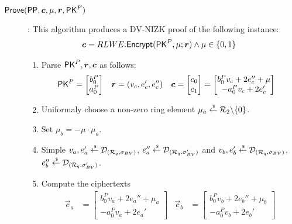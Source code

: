 \begin{description}
\item[$\Prove(\PPP, \vec{c}, \mu, \vec{r}, \PK^P)$]: This algorithm produces a DV-NIZK proof of the following instance:
  \begin{align*}
    \vec{c} &= RLWE.\Enc(\PK^P, \mu; \vec{r}) \wedge \mu \in \{0,1\}
  \end{align*}
  \begin{enumerate}
  \item Parse $\PK^P, \vec{r}, \vec{c}$ as follows:
    \begin{align*}
      \PK^P &= \begin{bmatrix} b_0^P \\ a_0^P \end{bmatrix} &
      \vec{r} &= (v_c, e_c', e_c'')&
      \vec{c} &= \begin{bmatrix} c_0\\ c_1\end{bmatrix} = \begin{bmatrix} b_0^P v_c + 2 e_c'' + \mu \\ -a_0^Pv_c + 2 e_c'\end{bmatrix}
    \end{align*}
  \item Uniformaly choose a non-zero ring element $\mu_a \stackrel{{\scriptscriptstyle \mkern4mu \$}}{\gets} {\mathcal{R}}_2 \backslash \{0\}$.
  \item Set $\mu_b = - \mu \cdot \mu_a$.
  \item Simple $v_a, e_a' \stackrel{{\scriptscriptstyle \mkern4mu \$}}{\gets} \mathcal{D}_{({\mathcal{R}}_q, \sigma_{BV})}$, $e_a'' \stackrel{{\scriptscriptstyle \mkern4mu \$}}{\gets} \mathcal{D}_{({\mathcal{R}}_q. \sigma_{BV}')}$ and $v_b, e_b' \stackrel{{\scriptscriptstyle \mkern4mu \$}}{\gets} \mathcal{D}_{({\mathcal{R}}_q, \sigma_{BV})}$, $e_b'' \stackrel{{\scriptscriptstyle \mkern4mu \$}}{\gets} \mathcal{D}_{({\mathcal{R}}_q. \sigma_{BV}')}$.
  \item Compute the ciphertexts
    \begin{align*}
      \vec{c}_a &= \begin{bmatrix} b_0^Pv_a + 2 e_a'' + \mu_a \\ - a_0^Pv_a + 2 e_a'\end{bmatrix} &
        \vec{c}_b &= \begin{bmatrix} b_0^Pv_b + 2 e_b'' + \mu_b \\ - a_0^Pv_b + 2 e_b'\end{bmatrix} 

\end{align*}
\end{enumerate}
\end{description}
